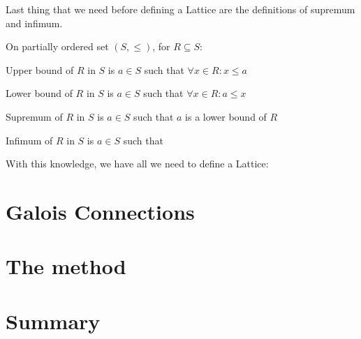 Last thing that we need before defining a Lattice are the definitions of supremum and infimum.

\begin{defn}
    On partially ordered set $(S, \leq)$, for $R \subseteq S$:

    Upper bound of $R$ in $S$ is $a \in S$ such that $\forall x \in R: x \leq a$

    Lower bound of $R$ in $S$ is $a \in S$ such that $\forall x \in R: a \leq x$

    Supremum of $R$ in $S$ is $a \in S$ such that $a$ is a lower bound of $R$

    Infimum of $R$ in $S$ is $a \in S$ such that
\end{defn}

With this knowledge, we have all we need to define a Lattice:
\begin{defn}[Lattice]

\end{defn}





\section{Galois Connections} %


\section{The method} %

\section*{Summary}
